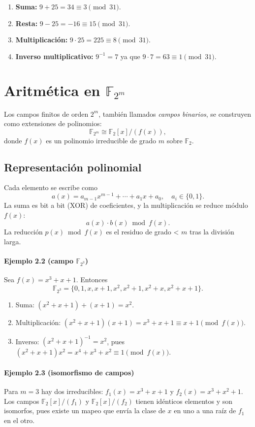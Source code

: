 \begin{enumerate}
  \item \textbf{Suma:} $9 + 25 = 34 \equiv 3 \pmod{31}.$
  \item \textbf{Resta:} $9 - 25 = -16 \equiv 15 \pmod{31}.$
  \item \textbf{Multiplicación:} $9 \cdot 25 = 225 \equiv 8 \pmod{31}.$
  \item \textbf{Inverso multiplicativo:} $9^{-1} = 7$ ya que $9 \cdot 7 = 63 \equiv 1 \pmod{31}.$
\end{enumerate}

\section{Aritmética en \texorpdfstring{$\mathbb{F}_{2^m}$}{F2m}}
Los campos finitos de orden $2^m$, también llamados \emph{campos binarios}, se construyen como extensiones de polinomios:
\[
  \mathbb{F}_{2^m}\cong\mathbb{F}_2[x]/(f(x)),
\]
donde $f(x)$ es un polinomio irreducible de grado $m$ sobre $\mathbb{F}_2$.

\subsection{Representación polinomial}
Cada elemento se escribe como
\[
  a(x)=a_{m-1}x^{m-1}+\cdots+a_1x+a_0,\quad a_i\in\{0,1\}.
\]
La suma es bit a bit (XOR) de coeficientes, y la multiplicación se reduce módulo $f(x)$:
\[
  a(x)\cdot b(x)\bmod f(x).
\]
La reducción $p(x)\bmod f(x)$ es el residuo de grado < $m$ tras la división larga.

\paragraph{Ejemplo 2.2 (campo $\mathbb{F}_{2^3}$)}
Sea $f(x)=x^3+x+1$. Entonces
\[
  \mathbb{F}_{2^3}=\{0,1,x,x+1,x^2,x^2+1,x^2+x,x^2+x+1\}.
\]
\begin{enumerate}
  \item Suma: $(x^2+x+1)+(x+1)=x^2$.
  \item Multiplicación: $(x^2+x+1)(x+1)=x^3+x+1\equiv x+1\pmod{f(x)}$.
  \item Inverso: $(x^2+x+1)^{-1}=x^2$, pues $(x^2+x+1)x^2=x^4+x^3+x^2\equiv1\pmod{f(x)}$.
\end{enumerate}

\paragraph{Ejemplo 2.3 (isomorfismo de campos)}
Para $m=3$ hay dos irreducibles: $f_1(x)=x^3+x+1$ y $f_2(x)=x^3+x^2+1$. Los campos $\mathbb{F}_2[x]/(f_1)$ y $\mathbb{F}_2[x]/(f_2)$ tienen idénticos elementos y son isomorfos, pues existe un mapeo que envía la clase de $x$ en uno a una raíz de $f_1$ en el otro.

